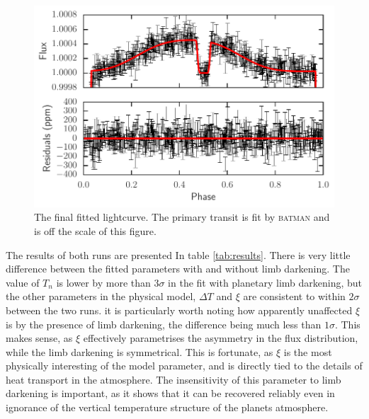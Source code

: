 \documentclass[a4paper,fleqn,usenatbib]{mnras}
\begin{document}
\begin{figure}
\begin{center}
\includegraphics[width=\columnwidth]{img/new_lc.pdf}
\caption{The final fitted lightcurve. The primary transit is fit by \textsc{batman} and is off the scale of this figure.}
\label{fig:phase folded}
\end{center}
\end{figure}

The results of both runs are presented In table \ref{tab:results}. There is very little difference between the fitted parameters with and without limb darkening. The value of $T_n$ is lower by more than $3\sigma$ in the fit with planetary limb darkening, but the other parameters in the physical model, $\Delta T$ and $\xi$ are consistent to within $2\sigma$ between the two runs. it is particularly worth noting how apparently unaffected $\xi$ is by the presence of limb darkening, the difference being much less than $1\sigma$. This makes sense, as $\xi$ effectively parametrises the asymmetry in the flux distribution, while the limb darkening is symmetrical. This is fortunate, as $\xi$ is the most physically interesting of the model parameter, and is directly tied to the details of heat transport in the atmosphere. The insensitivity of this parameter to limb darkening is important, as it shows that it can be recovered reliably even in ignorance of the vertical temperature structure of the planets atmosphere.
\end{document}
